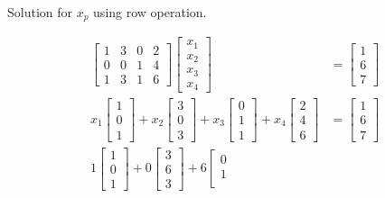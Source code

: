 \documentclass[main.tex]{subfiles}
\begin{document}
Solution for $x_p$ using row operation.

$$
\begin{aligned}
\left[\begin{array}{llll}
1 & 3 & 0 & 2 \\
0 & 0 & 1 & 4 \\
1 & 3 & 1 & 6
\end{array}\right]\left[\begin{array}{l}
x_{1} \\
x_{2} \\
x_{3} \\
x_{4}
\end{array}\right]&=\left[\begin{array}{l}
1 \\
6 \\
7
\end{array}\right]\\
x_{1}\left[\begin{array}{l}
1 \\
0 \\
1
\end{array}\right]+x_{2}\left[\begin{array}{l}
3 \\
0 \\
3
\end{array}\right]+x_{3}\left[\begin{array}{l}
0 \\
1 \\
1
\end{array}\right]+x_{4}\left[\begin{array}{l}
2 \\
4 \\
6
\end{array}\right] & = \left[\begin{array}{l}
1 \\
6 \\
7
\end{array}\right]\\
1\left[\begin{array}{l}
1 \\
0 \\
1
\end{array}\right]+0\left[\begin{array}{l}
3 \\
6 \\
3
\end{array}\right]+6\left[\begin{array}{l}
0 \\
1 \\

\end{array}
\end{aligned}$$
\end{document}
